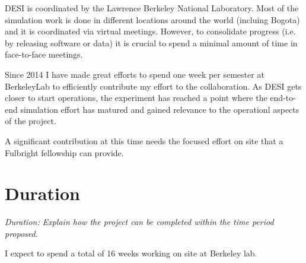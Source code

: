 \documentclass[12pt]{article}
\begin{document}
DESI is coordinated by the Lawrence Berkeley National Laboratory.
Most of the simulation work is done in different locations around the
world (incluing Bogota) and it is coordinated via virtual meetings. 
However, to consolidate progress (i.e. by releasing software or data)
it is crucial to spend a minimal amount of time in face-to-face meetings.

Since 2014 I have made great efforts to spend one week per semester at
BerkeleyLab to efficiently contribute my effort to the collaboration. 
As DESI gets closer to start operations, the experiment has reached a
point where the end-to-end simulation effort has matured and gained
relevance to the operationl aspects of the project.

A significant contribution at this time needs the focused effort on
site that a Fulbright fellowship can provide. 

\section*{Duration}
\textit{ Duration: Explain how the project can be completed within the time
period proposed. }

I expect to spend a total of 16 weeks working on site at Berkeley
lab. 
\end{document}
